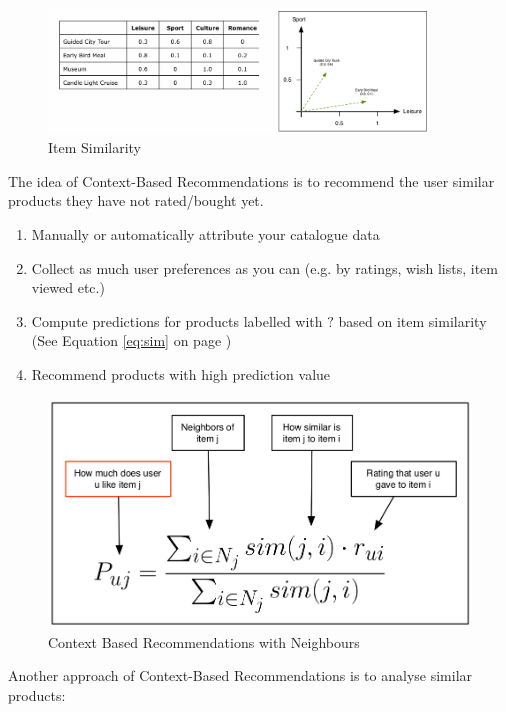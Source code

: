 \documentclass[11pt]{article}
\begin{document}
\begin{figure}[htb!]
    \centering
    \includegraphics[keepaspectratio=true, width=0.9\textwidth]{item_similarity.png}
    \caption{Item Similarity}
    \label{fig:item_similarity}
\end{figure}

The idea of Context-Based Recommendations is to recommend the user similar products they have not rated/bought yet.

\begin{enumerate}
    \item Manually or automatically attribute your catalogue data
    \item Collect as much user preferences as you can (e.g. by ratings, wish lists, item viewed etc.)
    \item Compute predictions for products labelled with $?$ based on item similarity (See Equation \ref{eq:sim} on page \pageref{eq:sim})
    \item Recommend products with high prediction value
\end{enumerate}

\begin{figure}
    \centering
    \includegraphics[keepaspectratio=true,height=10\baselineskip]{context_based_recommendations_v2.png}
    \caption{Context Based Recommendations with Neighbours}
    \label{fig:context_based_recommendations_2}
\end{figure}
Another approach of Context-Based Recommendations is to analyse similar products:
\end{document}
